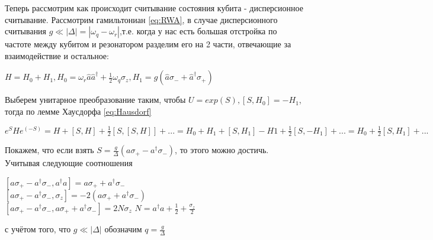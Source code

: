 \documentclass[12pt, twoside]{report}
\begin{document}
Теперь рассмотрим как происходит считывание состояния кубита - дисперсионное считывание. Рассмотрим гамильтониан \ref{eq:RWA}, в случае дисперсионного считывания $g\ll |\Delta|=|\omega_q-\omega_r|$,т.е. когда у нас есть большая отстройка по частоте между кубитом
и резонатором разделим его на 2 части, отвечающие за взаимодействие и остальное:
\begin{center}
$H=H_0+H_1,
H_0=\omega_r\hat{a}\hat{a}^{\dagger}+\frac{1}{2}\omega_q\sigma_z,
H_1=g(\hat{a}\sigma_-+\hat{a}^{\dagger}\sigma_+)
$
\end{center} 
Выберем унитарное преобразование таким, чтобы $U=exp(S),
[S,H_0]=-H_1$, тогда по лемме Хаусдорфа \ref{eq:Hausdorf}
\begin{center}
$e^SHe^(-S) = H+ [S,H]+\frac{1}{2}[S,[S,H]]+...=
H_0+H_1+[S,H_1]-H1+\frac{1}{2}[S,-H_1]+...=
H_0+\frac{1}{2}[S,H_1]+...$
\end{center}
Покажем, что если взять $S=\frac{g}{\Delta}(a\sigma_+-a^{\dagger}\sigma_-)$, то этого можно достичь.
Учитывая следующие соотношения
\begin{center}
$
[a\sigma_+-a^{\dagger}\sigma_-,a^{\dagger}a]=
a\sigma_++a^{\dagger}\sigma_-$\\
$
[a\sigma_+-a^{\dagger}\sigma_-,\sigma_z]=
-2(a\sigma_++a^{\dagger}\sigma_-)$\\
$
[a\sigma_+-a^{\dagger}\sigma_-,a\sigma_++
a^{\dagger}\sigma_-]=2N\sigma_z
$
$
N=a^{\dagger}a+\frac{1}{2}+\frac{\sigma_z}{2}
$ 
\end{center}
с учётом того, что $g \ll |\Delta|$ обозначим  $q=\frac{g}{\Delta}$ 
\end{document}
